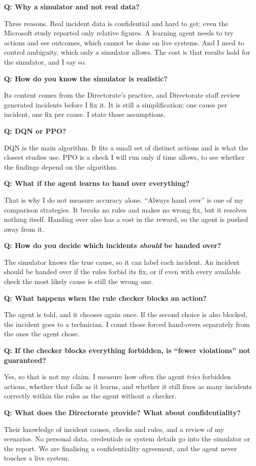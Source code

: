 \documentclass[10pt,a4paper]{article}
\newcommand{\qa}[2]{\par\vspace{3pt}\textbf{Q: #1}\par\vspace{-1pt}#2\par}
\begin{document}
\qa{Why a simulator and not real data?}{Three reasons. Real incident data is confidential and hard to get; even the Microsoft study reported only relative figures. A learning agent needs to try actions and see outcomes, which cannot be done on live systems. And I need to control ambiguity, which only a simulator allows. The cost is that results hold for the simulator, and I say so.}

\qa{How do you know the simulator is realistic?}{Its content comes from the Directorate's practice, and Directorate staff review generated incidents before I fix it. It is still a simplification: one cause per incident, one fix per cause. I state those assumptions.}

\qa{DQN or PPO?}{DQN is the main algorithm. It fits a small set of distinct actions and is what the closest studies use. PPO is a check I will run only if time allows, to see whether the findings depend on the algorithm.}

\qa{What if the agent learns to hand over everything?}{That is why I do not measure accuracy alone. ``Always hand over'' is one of my comparison strategies. It breaks no rules and makes no wrong fix, but it resolves nothing itself. Handing over also has a cost in the reward, so the agent is pushed away from it.}

\qa{How do you decide which incidents \emph{should} be handed over?}{The simulator knows the true cause, so it can label each incident. An incident should be handed over if the rules forbid its fix, or if even with every available check the most likely cause is still the wrong one.}

\qa{What happens when the rule checker blocks an action?}{The agent is told, and it chooses again once. If the second choice is also blocked, the incident goes to a technician. I count those forced hand-overs separately from the ones the agent chose.}

\qa{If the checker blocks everything forbidden, is ``fewer violations'' not guaranteed?}{Yes, so that is not my claim. I measure how often the agent \emph{tries} forbidden actions, whether that falls as it learns, and whether it still fixes as many incidents correctly within the rules as the agent without a checker.}

\qa{What does the Directorate provide? What about confidentiality?}{Their knowledge of incident causes, checks and rules, and a review of my scenarios. No personal data, credentials or system details go into the simulator or the report. We are finalising a confidentiality agreement, and the agent never touches a live system.}
\end{document}
